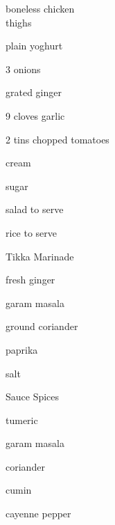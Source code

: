 \begin{ingredient}
    \begin{main}
        \item {} boneless chicken\\ thighs
        \item {} plain yoghurt
        \item 3 onions
        \item {} grated ginger
        \item 9 cloves garlic
        \item 2 tins chopped tomatoes
        \item {} cream
        \item {} sugar
        \item salad to serve
        \item rice to serve
    \end{main}
    \begin{subingredient}{Tikka Marinade}
        \item {} fresh ginger
        \item {} garam masala
        \item {} ground coriander
        \item {} paprika
        \item {} salt
    \end{subingredient}
    \begin{subingredient}{Sauce Spices}
        \item {} tumeric
        \item {} garam masala
        \item {} coriander
        \item {} cumin
        \item {} cayenne pepper
    \end{subingredient}
\end{ingredient}
\begin{recipe}
\end{recipe}